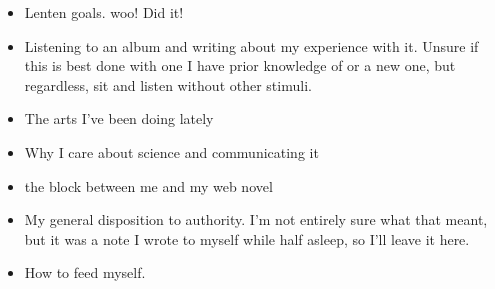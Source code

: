 \documentclass[12pt]{article}[titlepage]
\renewcommand{\,}{\textsuperscript{,}}
\begin{document}
\begin{itemize}
\begin{itemize}
\begin{itemize}
\begin{itemize}
\item Lenten goals. woo! Did it!  
\item Listening to an album and writing about my experience with it. Unsure if this is best done with one I have prior knowledge of or a new one, but regardless, sit and listen without other stimuli.   
\item The arts I've been doing lately   
\item Why I care about science and communicating it   
\item the block between me and my web novel   
\item My general disposition to authority. I'm not entirely sure what that meant, but it was a note I wrote to myself while half asleep, so I'll leave it here.  
\item How to feed myself.  
\end{itemize}   
\end{itemize}   
\end{itemize}   
\end{itemize}

  
\end{document}
